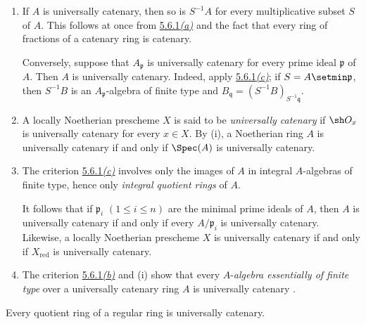 \begin{remarks}[5.6.3]
\label{IV.5.6.3}
\begin{enumerate}[{\rm(i)}]
\item
{}
\label{IV.5.6.3.i}
If $A$ is universally catenary, then so is $S^{-1}A$ for every
multiplicative subset $S$ of $A$.  This follows at once from
{\hyperref[IV.5.6.1.a]{5.6.1\emph{(a)}}} and the fact that every ring
of fractions of a
catenary ring is catenary.

Conversely, suppose that $A_{\mathfrak p}$ is universally catenary
for every prime ideal $\mathfrak p$ of $A$.  Then $A$ is universally
catenary.  Indeed, apply
{\hyperref[IV.5.6.1.c]{5.6.1\emph{(c)}}}; if
$S=A\setmin\mathfrak p$, then $S^{-1}B$ is an
$A_{\mathfrak p}$-algebra of finite type and $B_{\mathfrak q}=(S^{-1}B)_{S^{-1}\mathfrak q}$.

\item
{}
\label{IV.5.6.3.ii}
A locally Noetherian prescheme $X$ is said to be
\emph{universally catenary} if $\sh O_x$ is universally catenary for
every $x\in X$.  By (i), a Noetherian ring $A$ is universally
catenary if and only if $\Spec(A)$ is universally catenary.

\item
{}
\label{IV.5.6.3.iii}
The criterion {\hyperref[IV.5.6.1.c]{5.6.1\emph{(c)}}} involves only
the images of $A$ in
integral $A$-algebras of finite type, hence only \emph{integral quotient
rings} of $A$.


It follows that if
$\mathfrak p_i$ $(1\leq i\leq n)$ are the minimal prime ideals of
$A$, then $A$ is universally catenary if and only if every
$A/\mathfrak p_i$ is universally catenary.  Likewise, a locally
Noetherian prescheme $X$ is universally catenary if and only if
$X_{\mathrm{red}}$ is universally catenary.

\item
{}
\label{IV.5.6.3.iv}
The criterion {\hyperref[IV.5.6.1.b]{5.6.1\emph{(b)}}} and (i) show
that every $A$-\emph{algebra
essentially of finite type} over a universally catenary ring $A$ is
universally catenary .
\end{enumerate}
\end{remarks}

\begin{proposition}[5.6.4]
\label{IV.5.6.4}
Every quotient ring of a regular ring is universally catenary.
\end{proposition}

